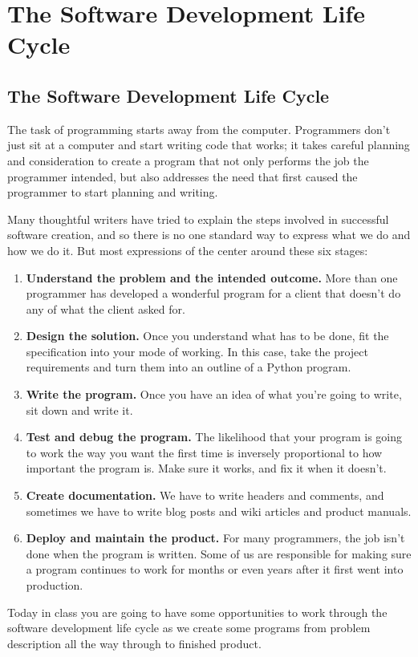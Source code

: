 
\chapter{The Software Development Life Cycle}
\label{day:bagels}


\section{The Software Development Life Cycle}

The task of programming starts away from the computer.  Programmers don't just sit at a computer and start writing code that works; it takes careful planning and consideration to create a program that not only performs the job the programmer intended, but also addresses the need that first caused the programmer to start planning and writing.

Many thoughtful writers have tried to explain the steps involved in successful software creation, and so there is no one standard way to express what we do and how we do it.  But most expressions of the  center around these six stages:

\begin{enumerate}
    \item \textbf{Understand the problem and the intended outcome.}  More than one programmer has developed a wonderful program for a client that doesn't do any of what the client asked for.
    \item \textbf{Design the solution.}  Once you understand what has to be done, fit the specification into your mode of working.  In this case, take the project requirements and turn them into an outline of a Python program.
    \item \textbf{Write the program.}  Once you have an idea of what you're going to write, sit down and write it.
    \item \textbf{Test and debug the program.}  The likelihood that your program is going to work the way you want the first time is inversely proportional to how important the program is.  Make sure it works, and fix it when it doesn't.
    \item \textbf{Create documentation.}  We have to write headers and comments, and sometimes we have to write blog posts and wiki articles and product manuals.
    \item \textbf{Deploy and maintain the product.}  For many programmers, the job isn't done when the program is written.  Some of us are responsible for making sure a program continues to work for months or even years after it first went into production.
\end{enumerate}

Today in class you are going to have some opportunities to work through the software development life cycle as we create some programs from problem description all the way through to finished product.